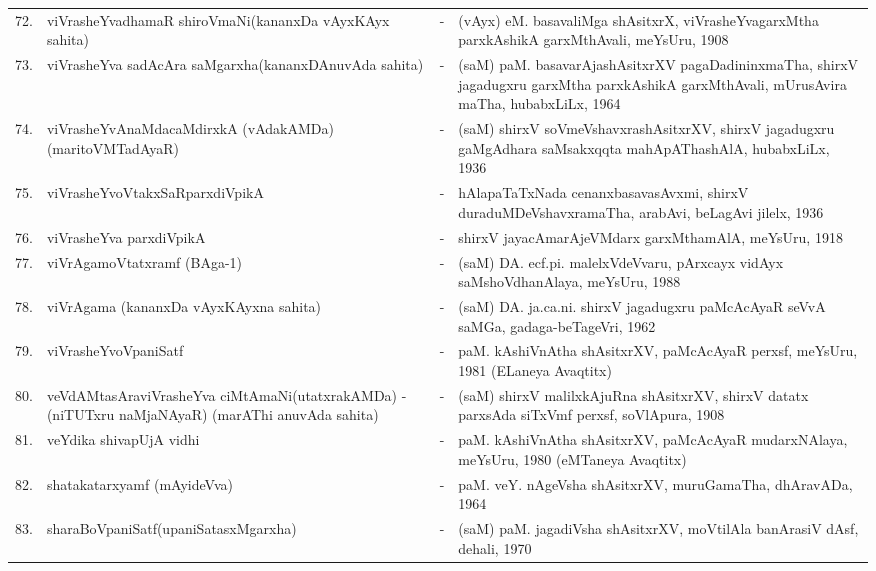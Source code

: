 {\begin{longtable}{rp{6cm}cp{9cm}<{\raggedright}@{}}
72. & viVrasheYvadhamaR shiroVmaNi\newline (kananxDa vAyxKAyx sahita) &-& (vAyx) eM. basavaliMga shAsitxrX, viVrasheYvagarxMtha parxkAshikA garxMthAvali, meYsUru, 1908\\
73. & viVrasheYva sadAcAra saMgarxha\newline (kananxDAnuvAda sahita) &-& (saM) paM. basavarAjashAsitxrXV pagaDadininxmaTha, shirxV jagadugxru garxMtha parxkAshikA garxMthAvali, mUrusAvira maTha, hubabxLiLx, 1964\\
74. & viVrasheYvAnaMdacaMdirxkA (vAdakAMDa)\newline (maritoVMTadAyaR) &-& (saM) shirxV soVmeVshavxrashAsitxrXV, shirxV jagadugxru gaMgAdhara saMsakxqqta mahApAThashAlA, hubabxLiLx, 1936\\
75. & viVrasheYvoVtakxSaRparxdiVpikA &-& hAlapaTaTxNada cenanxbasavasAvxmi, shirxV duraduMDeVshavxramaTha, arabAvi, beLagAvi jilelx, 1936\\
76. & viVrasheYva parxdiVpikA &-& shirxV jayacAmarAjeVMdarx garxMthamAlA, meYsUru, 1918\\
77. & viVrAgamoVtatxramf (BAga-1) &-& (saM) DA. ecf.pi. malelxVdeVvaru, pArxcayx vidAyx saMshoVdhanAlaya, meYsUru, 1988\\
78. & viVrAgama (kananxDa vAyxKAyxna sahita) &-& (saM) DA. ja.ca.ni. shirxV jagadugxru paMcAcAyaR seVvA saMGa, gadaga-beTageVri, 1962\\
79. & viVrasheYvoVpaniSatf &-& paM. kAshiVnAtha shAsitxrXV, paMcAcAyaR perxsf, meYsUru, 1981 (ELaneya Avaqtitx)\\
80. & veVdAMtasAraviVrasheYva ciMtAmaNi\newline (utatxrakAMDa) - (niTUTxru naMjaNAyaR) (marAThi anuvAda sahita) &-& (saM) shirxV malilxkAjuRna shAsitxrXV, shirxV datatx parxsAda siTxVmf perxsf, soVlApura, 1908\\
81. & veYdika shivapUjA vidhi &-& paM. kAshiVnAtha shAsitxrXV, paMcAcAyaR mudarxNAlaya, meYsUru, 1980 (eMTaneya Avaqtitx)\\
82. & shatakatarxyamf (mAyideVva) &-& paM. veY. nAgeVsha shAsitxrXV, muruGamaTha, dhAravADa, 1964\\
83. & sharaBoVpaniSatf\newline (upaniSatasxMgarxha) &-& (saM) paM. jagadiVsha shAsitxrXV, moVtilAla banArasiV dAsf, dehali, 1970\\

\end{longtable}}
